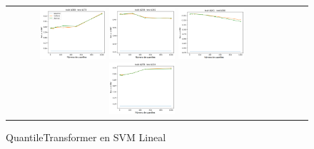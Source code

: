 \begin{figure}[h!]
\begin{tabular}{cccc}
  \includegraphics[width=0.25\textwidth]{Kap4/Figure_5.png}  \includegraphics[width=0.25\textwidth]{Kap4/Figure_6.png}
  \includegraphics[width=0.25\textwidth]{Kap4/Figure_7.png}  \includegraphics[width=0.25\textwidth]{Kap4/Figure_8.png} 
\end{tabular}
\caption{QuantileTransformer en SVM Lineal}
\label{fig:svml_quantiles}
\end{figure}

